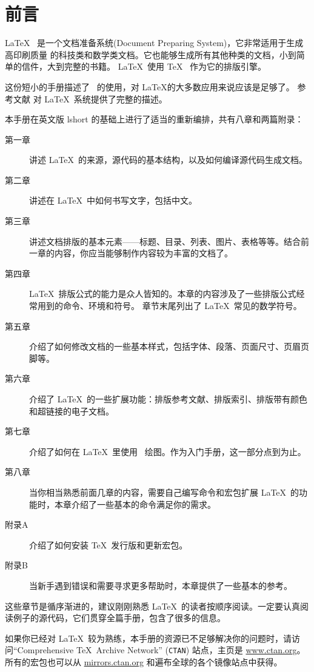 \chapter{前言}

\LaTeX\ \cite{manual} 是一个文档准备系统(Document Preparing System)，它非常适用于生成高印刷质量
的科技类和数学类文档。它也能够生成所有其他种类的文档，小到简单的信件，大到完整的书籍。
\LaTeX~使用 \TeX\ \cite{texbook} 作为它的排版引擎。%

这份短小的手册描述了 \LaTeXe\ 的使用，对 \LaTeX 的大多数应用来说应该是足够了。
参考文献 \cite{manual,companion} 对 \LaTeX\ 系统提供了完整的描述。%

\bigskip
本手册在英文版 lshort 的基础上进行了适当的重新编排，共有八章和两篇附录：%
\begin{description}%
\item[第一章] 讲述 \LaTeX\ 的来源，源代码的基本结构，以及如何编译源代码生成文档。
\item[第二章] 讲述在 \LaTeX\ 中如何书写文字，包括中文。%
\item[第三章] 讲述文档排版的基本元素——标题、目录、列表、图片、表格等等。结合前一章的内容，你应当能够制作内容较为丰富的文档了。%
\item[第四章] \LaTeX\ 排版公式的能力是众人皆知的。本章的内容涉及了一些排版公式经常用到的命令、环境和符号。
              章节末尾列出了 \LaTeX\ 常见的数学符号。%
\item[第五章] 介绍了如何修改文档的一些基本样式，包括字体、段落、页面尺寸、页眉页脚等。
\item[第六章] 介绍了 \LaTeX\ 的一些扩展功能：排版参考文献、排版索引、排版带有颜色和超链接的电子文档。
\item[第七章] 介绍了如何在 \LaTeX\ 里使用 \TikZ\ 绘图。作为入门手册，这一部分点到为止。
\item[第八章] 当你相当熟悉前面几章的内容，需要自己编写命令和宏包扩展 \LaTeX\ 的功能时，本章介绍了一些基本的命令满足你的需求。
\end{description}%
\begin{description}
\item[附录A] 介绍了如何安装 \TeX\ 发行版和更新宏包。
\item[附录B] 当新手遇到错误和需要寻求更多帮助时，本章提供了一些基本的参考。
\end{description}

\bigskip
这些章节是循序渐进的，建议刚刚熟悉 \LaTeX\ 的读者按顺序阅读。一定要认真阅读例子的源代码，它们贯穿全篇手册，包含了很多的信息。%

\bigskip
如果你已经对 \LaTeX\ 较为熟练，本手册的资源已不足够解决你的问题时，请访问``Comprehensive
\TeX\ Archive Network'' (\texttt{CTAN}) 站点，主页是 \url{www.ctan.org}。
所有的宏包也可以从 \url{mirrors.ctan.org} 和遍布全球的各个镜像站点中获得。

